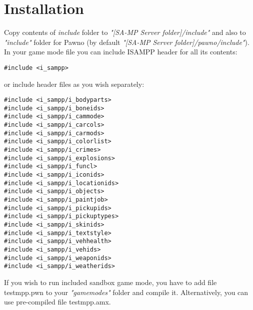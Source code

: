 \documentclass{article}
\begin{document}
\section{Installation}
Copy contents of \textit{include} folder to \textit{"[SA-MP Server folder]/include"} and also to \textit{"include"} folder for Pawno (by default \textit{"[SA-MP Server folder]/pawno/include"}).
\bigskip
\\In your game mode file you can include ISAMPP header for all its contents:
\begin{verbatim}
#include <i_sampp>
\end{verbatim}
or include header files as you wish separately:
\begin{verbatim}
#include <i_sampp/i_bodyparts>
#include <i_sampp/i_boneids>
#include <i_sampp/i_cammode>
#include <i_sampp/i_carcols>
#include <i_sampp/i_carmods>
#include <i_sampp/i_colorlist>
#include <i_sampp/i_crimes>
#include <i_sampp/i_explosions>
#include <i_sampp/i_funcl>
#include <i_sampp/i_iconids>
#include <i_sampp/i_locationids>
#include <i_sampp/i_objects>
#include <i_sampp/i_paintjob>
#include <i_sampp/i_pickupids>
#include <i_sampp/i_pickuptypes>
#include <i_sampp/i_skinids>
#include <i_sampp/i_textstyle>
#include <i_sampp/i_vehhealth>
#include <i_sampp/i_vehids>
#include <i_sampp/i_weaponids>
#include <i_sampp/i_weatherids>
\end{verbatim}
If you wish to run included sandbox game mode, you have to add file testmpp.pwn to your \textit{"gamemodes"} folder and compile it. Alternatively, you can use pre-compiled file testmpp.amx.

\newpage
\end{document}
